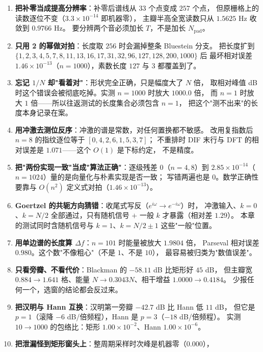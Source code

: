 \begin{enumerate}
  \item \textbf{把补零当成提高分辨率}：补零后谱线从 $33$ 个点变成 $257$ 个点，
        但原栅格上的读数逐位不变（$3.3\times10^{-14}$ 即机器零），
        主瓣半高全宽读数只从 $1.5625$ Hz 收敛到 $0.9766$ Hz。
        要分辨两个音必须加长 $T$，不是加长 $N_{\text{pad}}$。
  \item \textbf{只用 2 的幂做对拍}：长度取 $256$ 时会漏掉整条 Bluestein 分支。
        把长度扩到 $\{1,2,3,4,5,7,8,11,13,16,17,31,32,96,127,128,200,1000\}$ 后
        最坏相对误差 $1.46\times10^{-13}$（$n=1000$），素数长度 $127$ 与 $3$ 都覆盖到了。
  \item \textbf{忘记 $1/N$ 却"看着对"}：形状完全正确，只是幅度大了 $N$ 倍，
        取相对峰值 dB 时这个错误会被彻底吃掉。实测 $n=1000$ 时放大 $1000.0$ 倍，
        而 $n=1$ 时放大 $1$ 倍——所以往返测试的长度集合必须包含 $n=1$，
        把这个"测不出来"的长度本身记录在案。
  \item \textbf{用冲激去测位反序}：冲激的谱是常数，对任何置换都不敏感。
        改用复指数后 $n=8$ 的指纹逐位等于 $[0,4,2,6,1,5,3,7]$；
        不重排时 DIF 末行与 DFT 的相对误差是 $1.071$——这个 $O(1)$ 是下标约定，
        不是精度。
  \item \textbf{把"两份实现一致"当成"算法正确"}：逐级残差 $0$（$n=4,8$）到
        $2.85\times10^{-14}$（$n=1024$）量的是向量化与朴素实现是否一致；
        写错两遍也是 $0$。数学正确性要靠与 $O(n^2)$ 定义式对拍（$1.46\times10^{-13}$）。
  \item \textbf{Goertzel 的共轭方向猜错}：收尾式写反（$e^{i\omega}\to e^{-i\omega}$）时，
        冲激输入、$k=0$、$k=N/2$ 全部通过，只有随机信号 $+$ 一般 $k$ 才暴露（相对差 $1.29$）。
        本章的测试同时含随机信号与 $k=1$、$k=N/2\pm1$ 这些"一般"位置。
  \item \textbf{用单边谱的长度算 $\Delta f$}：$n=101$ 时能量被放大 $1.9804$ 倍，
        Parseval 相对误差 $0.980$。这个数"不像粗心"（不是 $1$、不是 $10$），
        最容易被归类为"数值误差"。
  \item \textbf{只看旁瓣、不看代价}：Blackman 的 $-58.11$ dB 比矩形好 $45$ dB，
        但主瓣宽 $0.884\to1.641$ 格、能量 $N\to0.3043N$、相干增益 $1.0000\to0.4184$。
        少报任何一个，选窗的结论都会反过来。
  \item \textbf{把汉明与 Hann 互换}：汉明第一旁瓣 $-42.7$ dB 比 Hann 低 $11$ dB，
        但它是 $p=1$（滚降 $-6$ dB/倍频程），Hann 是 $p=3$（$-18$ dB/倍频程）。
        实测 $10\to1000$ 的包络比：矩形 $1.00\times10^{-2}$、Hann $1.00\times10^{-6}$。
  \item \textbf{把泄漏怪到矩形窗头上}：整周期采样时次峰是机器零（$0.000$），

\end{enumerate}
